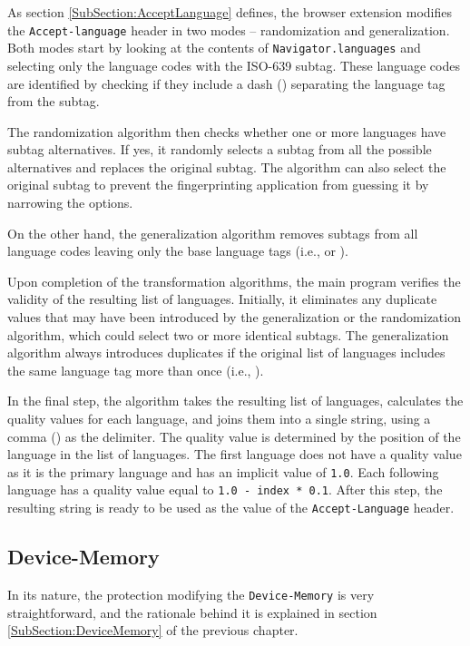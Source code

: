 As section \ref{SubSection:AcceptLanguage} defines, the browser extension modifies the \texttt{Accept-language} header in two modes -- randomization and generalization. Both modes start by looking at the contents of \texttt{Navigator.languages} and selecting only the language codes with the ISO-639 subtag. These language codes are identified by checking if they include a dash (\uv{-}) separating the language tag from the subtag.

The randomization algorithm then checks whether one or more languages have subtag alternatives. If yes, it randomly selects a subtag from all the possible alternatives and replaces the original subtag. The algorithm can also select the original subtag to prevent the fingerprinting application from guessing it by narrowing the options.

On the other hand, the generalization algorithm removes subtags from all language codes leaving only the base language tags (i.e.,  or ).

Upon completion of the transformation algorithms, the main program verifies the validity of the resulting list of languages. Initially, it eliminates any duplicate values that may have been introduced by the generalization or the randomization algorithm, which could select two or more identical subtags. The generalization algorithm always introduces duplicates if the original list of languages includes the same language tag more than once (i.e., ).

In the final step, the algorithm takes the resulting list of languages, calculates the quality values for each language, and joins them into a single string, using a comma (\uv{,}) as the delimiter. The quality value is determined by the position of the language in the list of languages. The first language does not have a quality value as it is the primary language and has an implicit value of \texttt{1.0}. Each following language has a quality value equal to \texttt{1.0 - index * 0.1}. After this step, the resulting string is ready to be used as the value of the \texttt{Accept-Language} header.

\subsection{Device-Memory}

In its nature, the protection modifying the \texttt{Device-Memory} is very straightforward, and the rationale behind it is explained in section \ref{SubSection:DeviceMemory} of the previous chapter.

